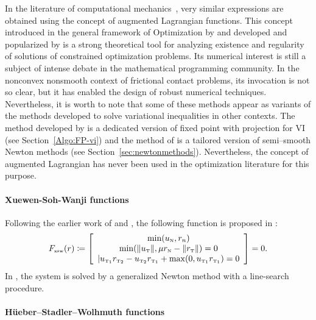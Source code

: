 {\begin{remark}
  \label{Rem:AugmentedLagrangian}
  In the literature of computational mechanics~\cite{Curnier.Alart88,Simo.Laursen1992,Alart.Curnier1991}, very similar expressions are obtained using the concept of augmented Lagrangian functions. This concept introduced in the general framework of Optimization by \cite{Hestenes1969} and developed and popularized by \cite{Rockafellar1974,Rockafellar1993} is a strong theoretical  tool for analyzing existence and regularity of solutions of constrained optimization problems. Its numerical interest is still a subject of intense debate in the mathematical programming community. In the nonconvex  nonsmooth context of frictional contact problems, its invocation is not so clear, but it has enabled the design of robust numerical techniques. Nevertheless, it is worth to note that some of these methods appear as variants of the methods developed to solve variational inequalities in other contexts. The method developed by \cite{Simo.Laursen1992} is a dedicated version of fixed point with projection for VI (see Section~\ref{Algo:FP-vi}) and the method of \cite{Alart.Curnier1991} is a tailored version of semi--smooth Newton methods (see Section~\ref{sec:newtonmethods}). Nevertheless, the concept of augmented Lagrangian has never been used in the optimization literature for this purpose.
\end{remark}

\paragraph{Xuewen-Soh-Wanji functions}
Following the earlier work of \cite{Park.Kwak1994} and \cite{Leung.ea1998}, the following function is proposed in \citep{Xuewen.ea2000}:
\begin{equation}
  \label{eq:XSW-II}
  F_{\xswtwo}(r) \coloneqq \left[
    \begin{array}{c}
      \min(u_\n,r_n)\\
      \min(\|u_\t\|, \mu r_\n - \|r_\t\|)=0\\
      | u_{\t_1} r_{\t_2} -  u_{\t_2} r_{\t_1} + \max(0,u_{\t_1} r_{\t_1} ) =0
  \end{array}\right] =0.
\end{equation}
In \citep{Xuewen.ea2000}, the system is solved by a generalized Newton method with a line-search procedure.

\paragraph{H\"{u}eber--Stadler--Wolhmuth functions}

}
